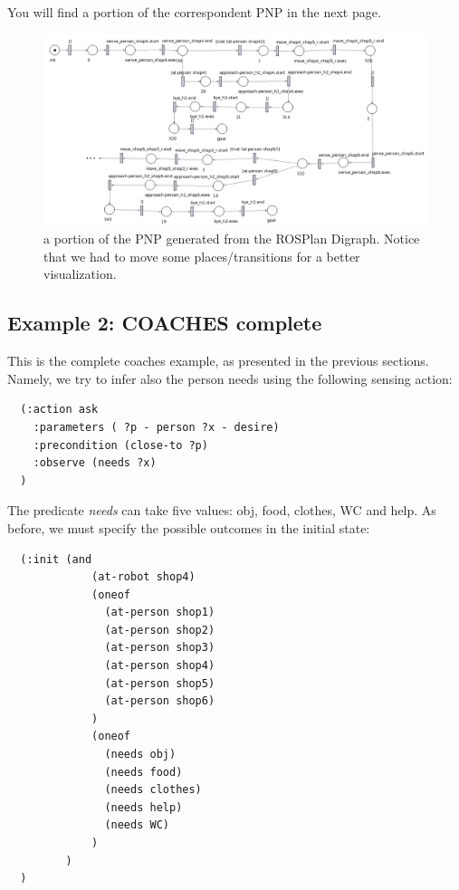 \documentclass[pdftex,12pt,a4paper]{report}
\begin{document}
\noindent You will find a portion of the correspondent PNP in the next page.\\
\newpage
\begin{figure}[H]
	\centering
	\includegraphics[scale=0.4]{images/rosplan_coaches1.png}
	\caption{a portion of the PNP generated from the ROSPlan Digraph. Notice that we had to move some places/transitions for a better visualization.}
\end{figure}


\subsection{Example 2: COACHES complete}
This is the complete coaches example, as presented in the previous sections. Namely, we try to infer also the person needs using the following sensing action:
\begin{verbatim}
  (:action ask
    :parameters ( ?p - person ?x - desire)
    :precondition (close-to ?p)
    :observe (needs ?x)
  )
\end{verbatim} 
\noindent The predicate \textit{needs} can take five values: 	obj, food, clothes, WC and help.
As before, we must specify the possible outcomes in the initial state:
\begin{verbatim}
  (:init (and
             (at-robot shop4)
             (oneof
               (at-person shop1)
               (at-person shop2)
               (at-person shop3)
               (at-person shop4)
               (at-person shop5)
               (at-person shop6)
             )
             (oneof
               (needs obj)
               (needs food)
               (needs clothes)
               (needs help)
               (needs WC)
             )
         )
  )
\end{verbatim}
\end{document}
